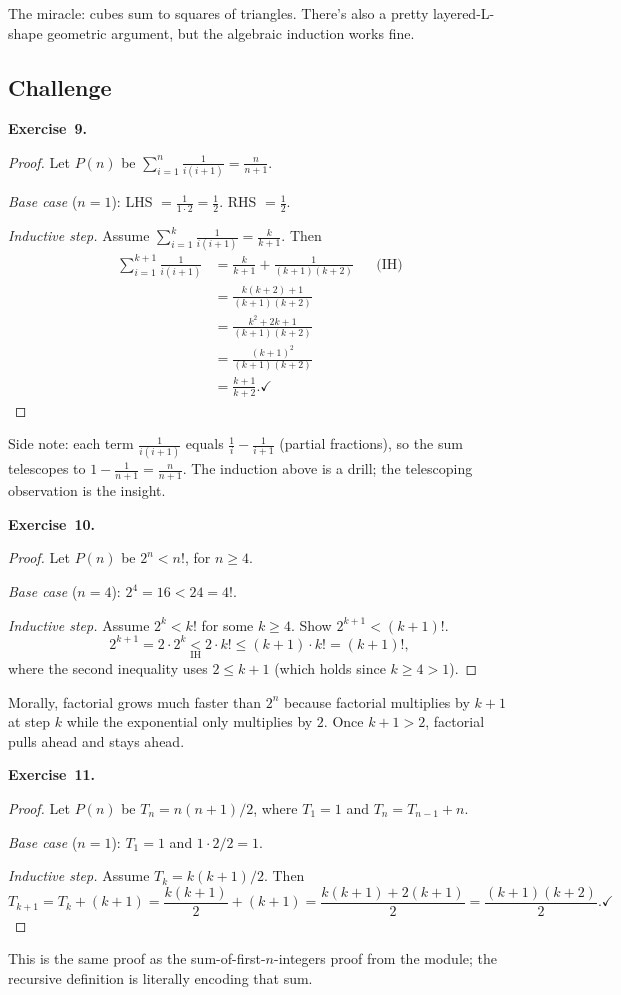 \documentclass[11pt]{article}
\begin{document}
The miracle: cubes sum to squares of triangles. There's also a pretty layered-L-shape geometric argument, but the algebraic induction works fine.

\subsection*{Challenge}

\textbf{Exercise~9.}
\begin{proof}
Let $P(n)$ be $\sum_{i=1}^{n} \frac{1}{i(i+1)} = \frac{n}{n+1}$.

\emph{Base case} ($n = 1$): LHS $= \frac{1}{1 \cdot 2} = \frac{1}{2}$. RHS $= \frac{1}{2}$. \checkmark

\emph{Inductive step.} Assume $\sum_{i=1}^{k} \frac{1}{i(i+1)} = \frac{k}{k+1}$. Then
\begin{align*}
  \sum_{i=1}^{k+1} \frac{1}{i(i+1)}
    &= \frac{k}{k+1} + \frac{1}{(k+1)(k+2)} && \text{(IH)} \\
    &= \frac{k(k+2) + 1}{(k+1)(k+2)} \\
    &= \frac{k^2 + 2k + 1}{(k+1)(k+2)} \\
    &= \frac{(k+1)^2}{(k+1)(k+2)} \\
    &= \frac{k+1}{k+2}. \checkmark
\end{align*}
\end{proof}
Side note: each term $\frac{1}{i(i+1)}$ equals $\frac{1}{i} - \frac{1}{i+1}$ (partial fractions), so the sum telescopes to $1 - \frac{1}{n+1} = \frac{n}{n+1}$. The induction above is a drill; the telescoping observation is the insight.

\medskip
\textbf{Exercise~10.}
\begin{proof}
Let $P(n)$ be $2^n < n!$, for $n \geq 4$.

\emph{Base case} ($n = 4$): $2^4 = 16 < 24 = 4!$. \checkmark

\emph{Inductive step.} Assume $2^k < k!$ for some $k \geq 4$. Show $2^{k+1} < (k+1)!$.
\[
  2^{k+1} = 2 \cdot 2^k \underset{\text{IH}}{<} 2 \cdot k! \leq (k+1) \cdot k! = (k+1)!,
\]
where the second inequality uses $2 \leq k + 1$ (which holds since $k \geq 4 > 1$). \checkmark
\end{proof}
Morally, factorial grows much faster than $2^n$ because factorial multiplies by $k + 1$ at step $k$ while the exponential only multiplies by $2$. Once $k + 1 > 2$, factorial pulls ahead and stays ahead.

\medskip
\textbf{Exercise~11.}
\begin{proof}
Let $P(n)$ be $T_n = n(n+1)/2$, where $T_1 = 1$ and $T_n = T_{n-1} + n$.

\emph{Base case} ($n = 1$): $T_1 = 1$ and $1 \cdot 2 / 2 = 1$. \checkmark

\emph{Inductive step.} Assume $T_k = k(k+1)/2$. Then
\[
  T_{k+1} = T_k + (k+1) = \frac{k(k+1)}{2} + (k+1) = \frac{k(k+1) + 2(k+1)}{2} = \frac{(k+1)(k+2)}{2}. \checkmark
\]
\end{proof}
This is the same proof as the sum-of-first-$n$-integers proof from the module; the recursive definition is literally encoding that sum.
\end{document}
